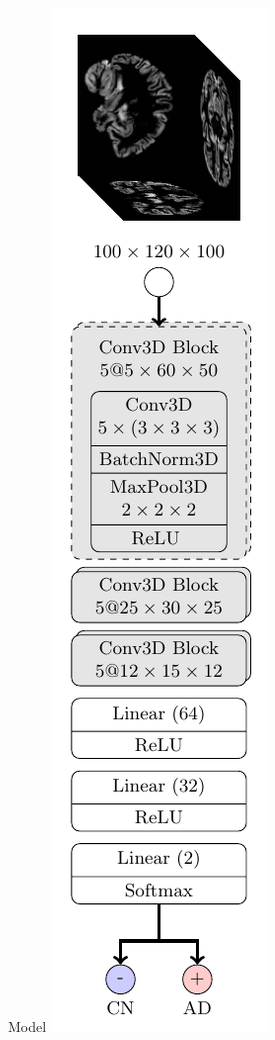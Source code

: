 \documentclass[aspectratio=169]{beamer}
\begin{document}
\begin{frame}{Model}
	\centering
	\includegraphics[angle=90, width=\textwidth]{tikz/cnn.tikz/cnn.pdf}
\end{frame}
\end{document}
